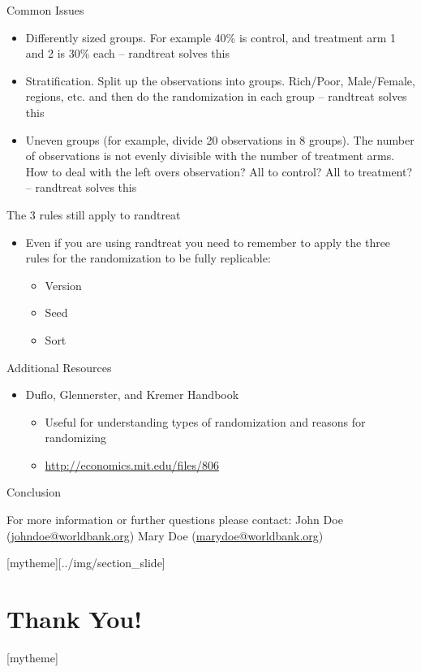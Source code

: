 \documentclass[aspectratio=169]{beamer}
\newcommand{\sectionpic}[2]{
	\setbeamertemplate{section page}[mytheme][#2]
	\section{#1}
	\setbeamertemplate{section page}[mytheme]
}
\begin{document}
\begin{frame}{Common Issues}
\begin{itemize}
	\item Differently sized groups. For example 40\% is control, and treatment arm 1 and 2 is 30\% each – randtreat solves this
	\item Stratification. Split up the observations into groups. Rich/Poor, Male/Female, regions, etc. and then do the randomization in each group – randtreat solves this
	\item Uneven groups (for example, divide 20 observations in 8 groups). The number of observations is not evenly divisible with the number of treatment arms. How to deal with the left overs observation? All to control? All to treatment? – randtreat solves this
\end{itemize}
\end{frame}



\begin{frame}{The 3 rules still apply to randtreat}
\begin{itemize}
	\item Even if you are using randtreat you need to remember to apply the three rules for the randomization to be fully replicable:
		\begin{itemize}
			\item Version
			\item Seed
			\item Sort
		\end{itemize}
\end{itemize}
\end{frame}


\begin{frame}{Additional Resources}
\begin{itemize}
	\item Duflo, Glennerster, and Kremer Handbook
		\begin{itemize}
			\item Useful for understanding types of randomization and reasons for randomizing
			\item \url{http://economics.mit.edu/files/806}
		\end{itemize}
\end{itemize}
\end{frame}


\begin{frame}{Conclusion}


\vspace{20mm}
For more information or further questions please contact:
\newline John Doe (\url{johndoe@worldbank.org}) \newline Mary Doe (\url{marydoe@worldbank.org})

\end{frame}

\sectionpic{Thank You!}{../img/section_slide}
\end{document}
